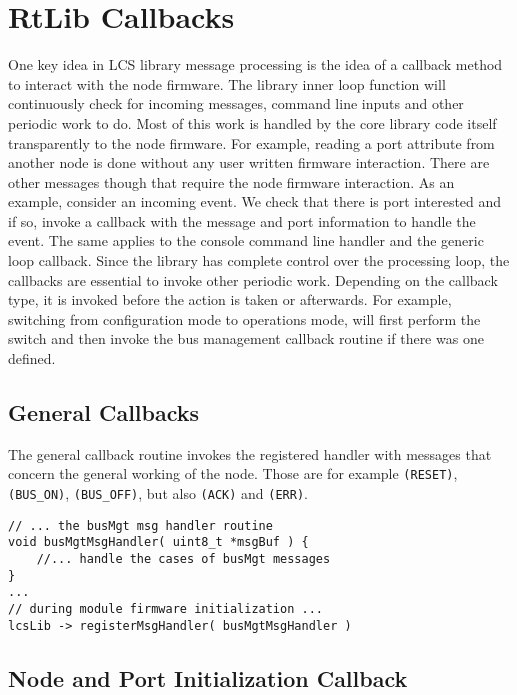 \chapter{RtLib Callbacks}

One key idea in LCS library message processing is the idea of a callback method to interact with the node firmware. The library inner loop function will continuously check for incoming messages, command line inputs and other periodic work to do. Most of this work is handled by the core library code itself transparently to the node firmware. For example, reading a port attribute from another node is done without any user written firmware interaction. There are other messages though that require the node firmware interaction. As an example, consider an incoming event. We check that there is port interested and if so, invoke a callback with the message and port information to handle the event. The same applies to the console command line handler and the generic loop callback. Since the library has complete control over the processing loop, the callbacks are essential to invoke other periodic work. Depending on the callback type, it is invoked before the action is taken or afterwards. For example, switching from configuration mode to operations mode, will first perform the switch and then invoke the bus management callback routine if there was one defined.

\section{General Callbacks}

The general callback routine invokes the registered handler with messages that concern the general working of the node. Those are for example \texttt{(RESET)}, \texttt{(BUS\_ON)}, \texttt{(BUS\_OFF)}, but also \texttt{(ACK)} and \texttt{(ERR)}.

\lstset{style=codesnippetstyle}
\begin{lstlisting}
// ... the busMgt msg handler routine
void busMgtMsgHandler( uint8_t *msgBuf ) {
	//... handle the cases of busMgt messages
}
...
// during module firmware initialization ...
lcsLib -> registerMsgHandler( busMgtMsgHandler )
\end{lstlisting}

\section{Node and Port Initialization Callback}

